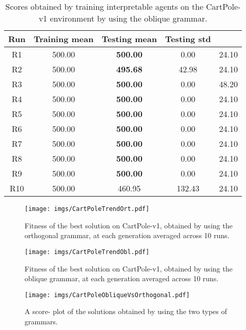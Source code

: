 \documentclass[review,english]{elsarticle}
\begin{document}
\begin{table}[p]
\begin{center}
\begin{tabular}{|c|c|c|c|c|} \hline  \textbf{Run} & \textbf{Training mean} & \textbf{Testing mean} & \textbf{Testing std} & \textbf{}\\ \hline
R1 & 500.00 & \textbf{500.00} & 0.00 & 24.10 \\ R2 & 500.00 & \textbf{495.68} & 42.98 & 24.10 \\ R3 & 500.00 & \textbf{500.00} & 0.00 & 48.20 \\ R4 & 500.00 & \textbf{500.00} & 0.00 & 24.10 \\ R5 & 500.00 & \textbf{500.00} & 0.00 & 24.10 \\ R6 & 500.00 & \textbf{500.00} & 0.00 & 24.10 \\ R7 & 500.00 & \textbf{500.00} & 0.00 & 24.10 \\ R8 & 500.00 & \textbf{500.00} & 0.00 & 24.10 \\ R9 & 500.00 & \textbf{500.00} & 0.00 & 24.10 \\ R10 & 500.00 & 460.95 & 132.43 & 24.10 \\ \hline
\end{tabular}
\end{center}
\caption{Scores obtained by training interpretable agents on the CartPole-v1 environment by using the oblique grammar.}
\label{tab:cp_obl_results}
\end{table}

\begin{figure}
    \centering
    \texttt{[image: imgs/CartPoleTrendOrt.pdf]}
    \caption{Fitness of the best solution on CartPole-v1, obtained by using the orthogonal grammar, at each generation averaged across 10 runs.}
    \label{fig:cp_ort_fitnesstrend}
\end{figure}

\begin{figure}
    \centering
    \texttt{[image: imgs/CartPoleTrendObl.pdf]}
    \caption{Fitness of the best solution on CartPole-v1, obtained by using the oblique grammar, at each generation averaged across 10 runs.}
    \label{fig:cp_obl_fitnesstrend}
\end{figure}

\begin{figure}
    \centering
    \texttt{[image: imgs/CartPoleObliqueVsOrthogonal.pdf]}
    \caption{A score- plot of the solutions obtained by using the two types of grammars.}
    \label{fig:cp_grammar_comparison}
\end{figure}
\end{document}
